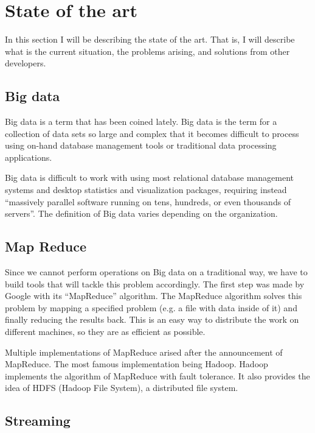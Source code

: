 \documentclass[a4paper,12pt]{article}
\begin{document}
\section{State of the art}

In this section I will be describing the state of the art. That is, I will
describe what is the current situation, the problems arising, and solutions
from other developers.

\subsection{Big data}

Big data\cite{wikibigdata} is a term that has been coined lately. Big data is
the term for a collection of data sets so large and complex that it becomes
difficult to process using on-hand database management tools or traditional
data processing applications.

Big data is difficult to work with using most relational database management
systems and desktop statistics and visualization packages, requiring instead
``massively parallel software running on tens, hundreds, or even thousands of
servers''. The definition of Big data varies depending on the organization.

\subsection{Map Reduce}

Since we cannot perform operations on Big data on a traditional way, we have to
build tools that will tackle this problem accordingly. The first step was made
by Google with its ``MapReduce'' algorithm\cite{mapreduce}. The MapReduce
algorithm solves this problem by mapping a specified problem (e.g. a file with
data inside of it) and finally reducing the results back. This is an easy way
to distribute the work on different machines, so they are as efficient as
possible.

Multiple implementations of MapReduce arised after the announcement of
MapReduce. The most famous implementation being Hadoop\cite{hadoop}. Hadoop
implements the algorithm of MapReduce with fault tolerance. It also provides
the idea of HDFS (Hadoop File System), a distributed file system.

\subsection{Streaming}
\end{document}

